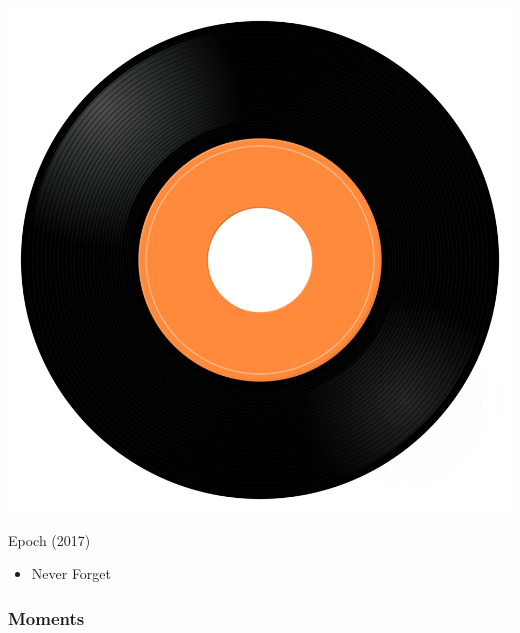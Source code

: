 \begin{minipage}[t]{0.25\textwidth}\vspace{0pt}
\captionsetup{type=figure}
\includegraphics[width=\textwidth]{Images/cover.png}
\caption*{Epoch (2017)}
\end{minipage}
\begin{minipage}[t]{0.25\textwidth}\vspace{0pt}
\begin{itemize}[nosep,leftmargin=1em,labelwidth=*,align=left]
	\setlength{\itemsep}{0pt}
	\item Never Forget
\end{itemize}
\end{minipage}

\subsubsection{Moments}

